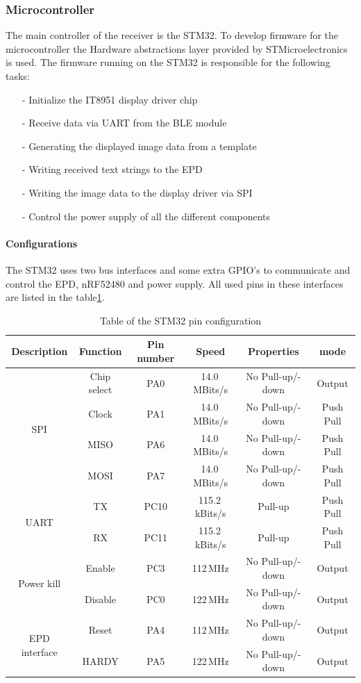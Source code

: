 \subsubsection{Microcontroller}
The main controller of the receiver is the STM32. To develop firmware for the microcontroller the Hardware abstractions layer provided by STMicroelectronics is used. The firmware running on the STM32 is responsible for the following tasks:
\begin{itemize}[H]
	\item[-] Initialize the IT8951 display driver chip
	\item[-] Receive data via UART from the BLE module
	\item[-] Generating the displayed image data from a template
	\item[-] Writing received text strings to the EPD
	\item[-] Writing the image data to the display driver via SPI
	\item[-] Control the power supply of all the different components
\end{itemize}

\paragraph{Configurations}
The STM32 uses two bus interfaces and some extra GPIO's to communicate and control the EPD, nRF52480 and power supply. All used pins in these interfaces are listed in the table\ref{table:stm32}.  

\begin{table}[!ht]
	\begin{tabular}{ |c|c|c|c|c|c| } 
		\hline
	Description & Function &Pin number & Speed& Properties& mode \\
		\hline
	\multirow{4}{4em}{SPI} 	& Chip select & PA0&14.0\,MBits/s &No Pull-up/-down& Output \\ 
								& Clock& PA1 & 14.0\,MBits/s&No Pull-up/-down& Push Pull \\ 
								& MISO & PA6&14.0\,MBits/s & No Pull-up/-down& Push Pull  \\ 
								& MOSI & PA7& 14.0\,MBits/s&No Pull-up/-down& Push Pull  \\ 
		\hline
	\multirow{2}{4em}{UART} & TX & PC10 & 115.2\,kBits/s & Pull-up& Push Pull   \\ 
								& RX & PC11 & 115.2\,kBits/s & Pull-up& Push Pull \\ 
	\hline
	
	\multirow{2}{4em}{Power kill} & Enable & PC3 & 112\,MHz &No Pull-up/-down& Output   \\ 
										  & Disable& PC0 & 122\,MHz &No Pull-up/-down& Output \\ 
	\hline
	
	\multirow{2}{4em}{EPD interface} & Reset & PA4 & 112\,MHz &No Pull-up/-down& Output   \\ 
									& HARDY& PA5 & 122\,MHz &No Pull-up/-down& Output \\ 
	\hline

	\end{tabular}
	\caption{Table of the STM32 pin configuration\label{table:stm32}}
\end{table}

